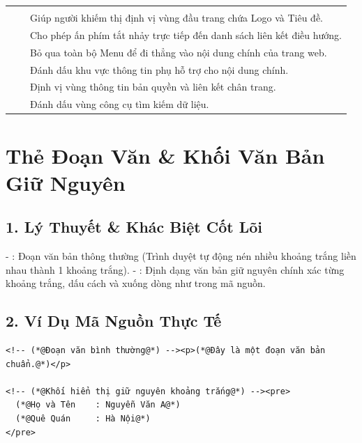 \begin{prettyTableBox}
\small
{}
\begin{tabularx}{\linewidth}{K{2.8cm} K{3.5cm} Z}
 &  &  \\
 &  & Giúp người khiếm thị định vị vùng đầu trang chứa Logo và Tiêu đề. \\
 &  & Cho phép ấn phím tắt nhảy trực tiếp đến danh sách liên kết điều hướng. \\
 &  & Bỏ qua toàn bộ Menu để đi thẳng vào nội dung chính của trang web. \\
 &  & Đánh dấu khu vực thông tin phụ hỗ trợ cho nội dung chính. \\
 &  & Định vị vùng thông tin bản quyền và liên kết chân trang. \\
 &  & Đánh dấu vùng công cụ tìm kiếm dữ liệu. \\
\end{tabularx}
\end{prettyTableBox}

\section{Thẻ Đoạn Văn  \& Khối Văn Bản Giữ Nguyên }
\subsection{1. Lý Thuyết \& Khác Biệt Cốt Lõi}
- : Đoạn văn bản thông thường (Trình duyệt tự động nén nhiều khoảng trắng liền nhau thành 1 khoảng trắng).
- : Định dạng văn bản giữ nguyên chính xác từng khoảng trắng, dấu cách và xuống dòng như trong mã nguồn.

\subsection{2. Ví Dụ Mã Nguồn Thực Tế}
\begin{codeWindow}
\begin{lstlisting}[language=HTML5]
<!-- (*@Đoạn văn bình thường@*) --><p>(*@Đây là một đoạn văn bản chuẩn.@*)</p>

<!-- (*@Khối hiển thị giữ nguyên khoảng trắng@*) --><pre>
  (*@Họ và Tên    : Nguyễn Văn A@*)
  (*@Quê Quán     : Hà Nội@*)
</pre>
\end{lstlisting}
\end{codeWindow}

